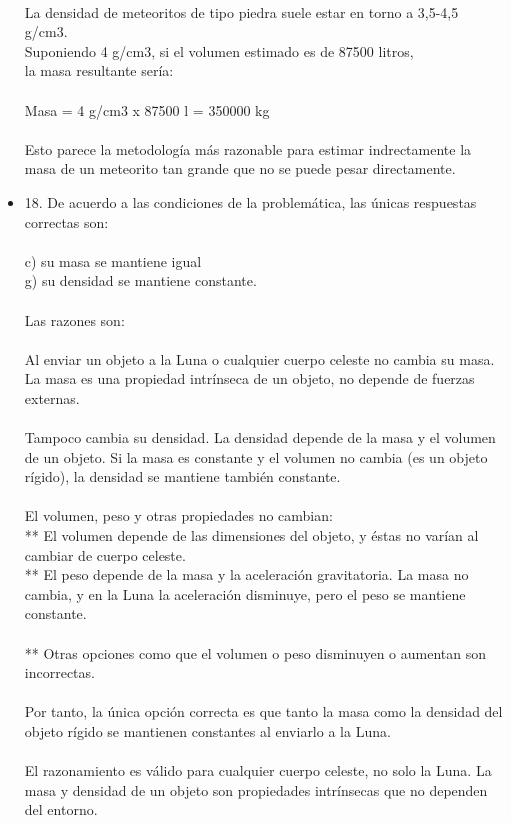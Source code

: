 \documentclass{article}
\begin{document}
\begin{itemize}
\\
La densidad de meteoritos de tipo piedra suele estar en torno a 3,5-4,5 g/cm3.\\
Suponiendo 4 g/cm3, si el volumen estimado es de 87500 litros,\\
la masa resultante sería:\\
\\
Masa = 4 g/cm3 x 87500 l = 350000 kg\\
\\
Esto parece la metodología más razonable para estimar indrectamente la masa de un meteorito tan grande que no se puede pesar directamente.\\
\item{18.}
De acuerdo a las condiciones de la problemática, las únicas respuestas correctas son:\\
\\
c) su masa se mantiene igual\\
g) su densidad se mantiene constante.\\
\\
Las razones son:\\
\\
Al enviar un objeto a la Luna o cualquier cuerpo celeste no cambia su masa. La masa es una propiedad intrínseca de un objeto, no depende de fuerzas externas.\\
\\
Tampoco cambia su densidad. La densidad depende de la masa y el volumen de un objeto. Si la masa es constante y el volumen no cambia (es un objeto rígido), la densidad se mantiene también constante.\\
\\
El volumen, peso y otras propiedades no cambian:\\
** El volumen depende de las dimensiones del objeto, y éstas no varían al cambiar de cuerpo celeste.\\
** El peso depende de la masa y la aceleración gravitatoria. La masa no cambia, y en la Luna la aceleración disminuye, pero el peso se mantiene constante.\\
\\
** Otras opciones como que el volumen o peso disminuyen o aumentan son incorrectas.\\
\\
Por tanto, la única opción correcta es que tanto la masa como la densidad del objeto rígido se mantienen constantes al enviarlo a la Luna.\\
\\
El razonamiento es válido para cualquier cuerpo celeste, no solo la Luna. La masa y densidad de un objeto son propiedades intrínsecas que no dependen del entorno.\\

\end{itemize}
\end{document}
